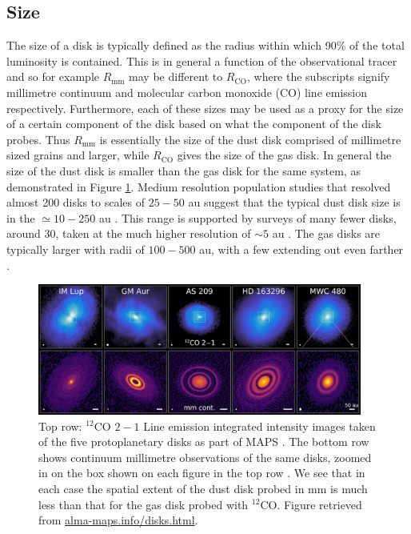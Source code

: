 \subsection{Size}

The size of a disk is typically defined as the radius within which 90\% of the total luminosity is contained.
This is in general a function of the observational tracer and so for example $R_\mathrm{mm}$ may be different to $R_\mathrm{CO}$, where the subscripts signify millimetre continuum and molecular carbon monoxide (CO) line emission respectively. 
Furthermore, each of these sizes may be used as a proxy for the size of a certain component of the disk based on what the component of the disk probes.
Thus $R_\mathrm{mm}$ is essentially the size of the dust disk comprised of millimetre sized grains and larger, while $R_\mathrm{CO}$ gives the size of the gas disk.
In general the size of the dust disk is smaller than the gas disk for the same system, as demonstrated in Figure \ref{fig:maps_disks}.
Medium resolution population studies that resolved almost 200 disks to scales of $25-50$ au suggest that the typical dust disk size is in the $\simeq 10 - 250$ au \citep{tripathi2017,andrews2018a,hendler2020}.
This range is supported by surveys of many fewer disks, around 30, taken at the much higher resolution of $\sim5$ au \citep{long2018,huang2018b}.
The gas disks are typically larger with radii of $100 - 500$ au, with a few extending out even farther \citep{ansdell2018,zhang2021}.

\begin{figure}
    \centering
    \includegraphics[width = 0.95\textwidth]{figures/Figure-DISKS-Website.png}
    \caption{Top row: $^{12}$CO $2-1$ Line emission integrated intensity images taken of the five protoplanetary disks as part of MAPS \citep{oberg2021}.
    The bottom row shows continuum millimetre observations of the same disks, zoomed in on the box shown on each figure in the top row \citep{andrews2018,huang2020,oberg2021}. 
    We see that in each case the spatial extent of the dust disk probed in mm is much less than that for the gas disk probed with $^{12}$CO.
    Figure retrieved from \url{alma-maps.info/disks.html}.}
    \label{fig:maps_disks}
\end{figure}

